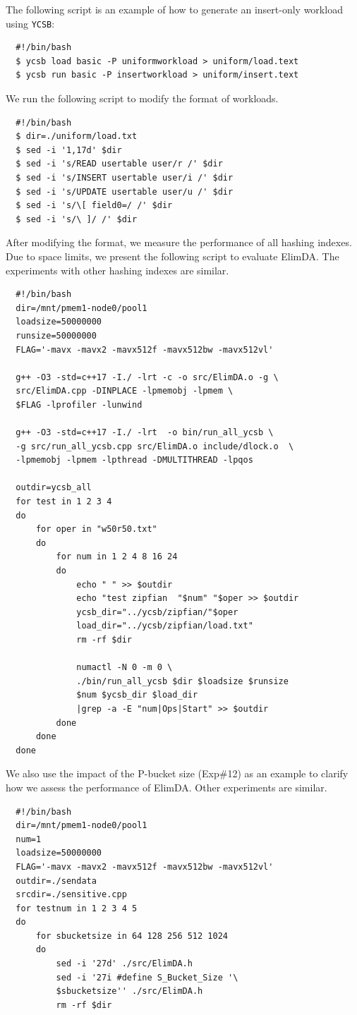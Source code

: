 \documentclass[sigconf, nonacm]{acmart}
\newcommand\sysname{\textsf{ElimDA}\xspace}
\renewcommand{\paragraph}[1]{\smallskip\noindent {\bf #1}}
\begin{document}
{The following script is an example of how to generate an insert-only workload using {\tt YCSB}:
\begin{verbatim}
  #!/bin/bash
  $ ycsb load basic -P uniformworkload > uniform/load.text
  $ ycsb run basic -P insertworkload > uniform/insert.text
\end{verbatim}

We run the following script to modify the format of workloads.
\begin{verbatim}
  #!/bin/bash
  $ dir=./uniform/load.txt
  $ sed -i '1,17d' $dir
  $ sed -i 's/READ usertable user/r /' $dir
  $ sed -i 's/INSERT usertable user/i /' $dir
  $ sed -i 's/UPDATE usertable user/u /' $dir
  $ sed -i 's/\[ field0=/ /' $dir
  $ sed -i 's/\ ]/ /' $dir
\end{verbatim}

After modifying the format, we measure the performance of all hashing indexes.
Due to space limits, we present the following script to evaluate \sysname.
The experiments with other hashing indexes are similar.
\begin{verbatim}
  #!/bin/bash
  dir=/mnt/pmem1-node0/pool1
  loadsize=50000000
  runsize=50000000
  FLAG='-mavx -mavx2 -mavx512f -mavx512bw -mavx512vl'

  g++ -O3 -std=c++17 -I./ -lrt -c -o src/ElimDA.o -g \
  src/ElimDA.cpp -DINPLACE -lpmemobj -lpmem \
  $FLAG -lprofiler -lunwind

  g++ -O3 -std=c++17 -I./ -lrt  -o bin/run_all_ycsb \
  -g src/run_all_ycsb.cpp src/ElimDA.o include/dlock.o  \
  -lpmemobj -lpmem -lpthread -DMULTITHREAD -lpqos

  outdir=ycsb_all
  for test in 1 2 3 4
  do
      for oper in "w50r50.txt"
      do
          for num in 1 2 4 8 16 24
          do
              echo " " >> $outdir
              echo "test zipfian  "$num" "$oper >> $outdir
              ycsb_dir="../ycsb/zipfian/"$oper
              load_dir="../ycsb/zipfian/load.txt"
              rm -rf $dir

              numactl -N 0 -m 0 \
              ./bin/run_all_ycsb $dir $loadsize $runsize
              $num $ycsb_dir $load_dir
              |grep -a -E "num|Ops|Start" >> $outdir
          done
      done
  done
\end{verbatim}

\paragraph{Experiments on Sensitivity:}
We also use the impact of the P-bucket size (Exp\#12)
as an example to clarify how we assess
the performance of \sysname.
Other experiments are similar.
\begin{verbatim}
  #!/bin/bash
  dir=/mnt/pmem1-node0/pool1
  num=1
  loadsize=50000000
  FLAG='-mavx -mavx2 -mavx512f -mavx512bw -mavx512vl'
  outdir=./sendata
  srcdir=./sensitive.cpp
  for testnum in 1 2 3 4 5
  do
      for sbucketsize in 64 128 256 512 1024
      do
          sed -i '27d' ./src/ElimDA.h
          sed -i '27i #define S_Bucket_Size '\
          $sbucketsize'' ./src/ElimDA.h
          rm -rf $dir


\end{verbatim}}
\end{document}
